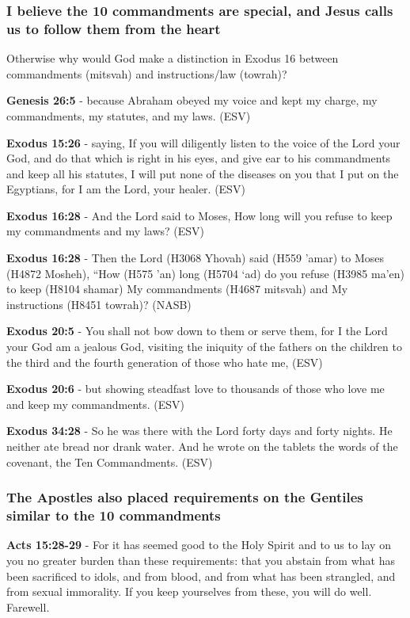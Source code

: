 \documentclass[11pt]{article}
\begin{document}
\subsubsection{I believe the 10 commandments are special, and Jesus calls us to follow them from the heart}
\label{sec:org99929ce}
Otherwise why would God make a distinction in Exodus 16 between commandments (mitsvah) and instructions/law (towrah)?

\textbf{Genesis 26:5} - because Abraham obeyed my voice and kept my charge, my commandments, my statutes, and my laws. (ESV)

\textbf{Exodus 15:26} - saying, If you will diligently listen to the voice of the Lord your God, and do that which is right in his eyes, and give ear to his commandments and keep all his statutes, I will put none of the diseases on you that I put on the Egyptians, for I am the Lord, your healer. (ESV)

\textbf{Exodus 16:28} - And the Lord said to Moses, How long will you refuse to keep my commandments and my laws? (ESV)

\textbf{Exodus 16:28} - Then the Lord (H3068 Yhovah) said (H559 'amar) to Moses (H4872 Mosheh), “How (H575 'an) long (H5704 `ad) do you refuse (H3985 ma'en) to keep (H8104 shamar) My commandments (H4687 mitsvah) and My instructions (H8451 towrah)? (NASB)

\textbf{Exodus 20:5} - You shall not bow down to them or serve them, for I the Lord your God am a jealous God, visiting the iniquity of the fathers on the children to the third and the fourth generation of those who hate me, (ESV)

\textbf{Exodus 20:6} - but showing steadfast love to thousands of those who love me and keep my commandments. (ESV)

\textbf{Exodus 34:28} - So he was there with the Lord forty days and forty nights. He neither ate bread nor drank water. And he wrote on the tablets the words of the covenant, the Ten Commandments. (ESV)

\subsubsection{The Apostles also placed requirements on the Gentiles similar to the 10 commandments}
\label{sec:org2b77263}
\textbf{Acts 15:28-29} - For it has seemed good to the Holy Spirit and to us to lay on you no greater burden than these requirements: that you abstain from what has been sacrificed to idols, and from blood, and from what has been strangled, and from sexual immorality. If you keep yourselves from these, you will do well. Farewell.
\end{document}
